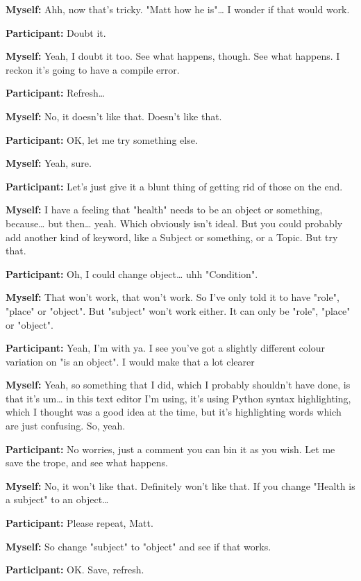 \documentclass[11pt]{report}
\newcommand{\llabel}[1]{\hypertarget{llineno:#1}{\linelabel{#1}}}
\begin{document}
\begin{linenumbers}
\textbf{Myself:} Ahh, now that's tricky. "Matt how he is"\ldots{} I wonder if that would work.

\textbf{Participant:} Doubt it.

\textbf{Myself:} Yeah, I doubt it too. See what happens, though. See what happens. I reckon it's going to have a compile error.

\textbf{Participant:} Refresh\ldots{}

\textbf{Myself:} No, it doesn't like that. Doesn't like that.

\textbf{Participant:} OK, let me try something else.

\textbf{Myself:} Yeah, sure.

\textbf{Participant:} Let's just give it a blunt thing of getting rid of those on the end.

\textbf{Myself:} I have a feeling that "health" needs to be an object or something, because\ldots{} but then\ldots{} yeah. Which obviously isn't ideal. But you could probably add another kind of keyword, like a Subject or something, or a Topic. But try that.

\textbf{Participant:} Oh, I could change object\ldots{} uhh "Condition".

\textbf{Myself:} That won't work, that won't work. So I've only told it to have
"role", "place" or "object". But "subject" won't work either. It can only be
"role", "place" or "object".\llabel{lne:feature5b}

\textbf{Participant:} Yeah, I'm with ya. I see you've got a slightly different colour variation on "is an object". I would make that a lot clearer

\textbf{Myself:} Yeah, so something that I did, which I probably shouldn't have done, is that it's um\ldots{} in this text editor I'm using, it's using Python syntax highlighting, which I thought was a good idea at the time, but it's highlighting words which are just confusing. So, yeah.

\textbf{Participant:} No worries, just a comment you can bin it as you wish. Let me save the trope, and see what happens.

\textbf{Myself:} No, it won't like that. Definitely won't like that. If you change "Health is a subject" to an object\ldots{}

\textbf{Participant:} Please repeat, Matt.

\textbf{Myself:} So change "subject" to "object" and see if that works.

\textbf{Participant:} OK. Save, refresh.


\end{linenumbers}
\end{document}
